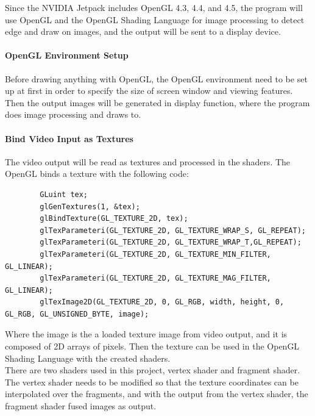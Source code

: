 \documentclass[letterpaper,10pt,serif,draftclsnofoot,onecolumn,compsoc,titlepage]{IEEEtran}
\begin{document}
Since the  NVIDIA Jetpack includes OpenGL 4.3, 4.4, and 4.5, the program will use 
OpenGL and the OpenGL Shading Language for image processing to detect edge and draw on 
images, and the output will be sent to a display device. \\

\paragraph{OpenGL Environment Setup}

Before drawing anything with OpenGL, the OpenGL environment need to be set up at first 
in order to specify the size of screen window and viewing features. Then the output 
images will be generated in display function, where the program does image processing 
and draws to. \\

\paragraph{Bind Video Input as Textures}

The video output will be read as textures and processed in the shaders. The OpenGL 
binds a texture with the following code:\\

	\begin{lstlisting}
		GLuint tex;
		glGenTextures(1, &tex);
		glBindTexture(GL_TEXTURE_2D, tex);
		glTexParameteri(GL_TEXTURE_2D, GL_TEXTURE_WRAP_S, GL_REPEAT);
		glTexParameteri(GL_TEXTURE_2D, GL_TEXTURE_WRAP_T,GL_REPEAT);
		glTexParameteri(GL_TEXTURE_2D, GL_TEXTURE_MIN_FILTER, GL_LINEAR);
		glTexParameteri(GL_TEXTURE_2D, GL_TEXTURE_MAG_FILTER, GL_LINEAR);
		glTexImage2D(GL_TEXTURE_2D, 0, GL_RGB, width, height, 0, GL_RGB, GL_UNSIGNED_BYTE, image);
	\end{lstlisting}

Where the image is the a loaded texture image from video output, and it is composed of 
2D arrays of pixels. Then the texture can be used in the OpenGL Shading Language with 
the created shaders.\\

There are two shaders used in this project, vertex shader and fragment shader. The 
vertex shader needs to be modified so that the texture coordinates can be interpolated 
over the fragments, and with the output from the vertex shader, the fragment shader 
fused images as output. \\
\end{document}
